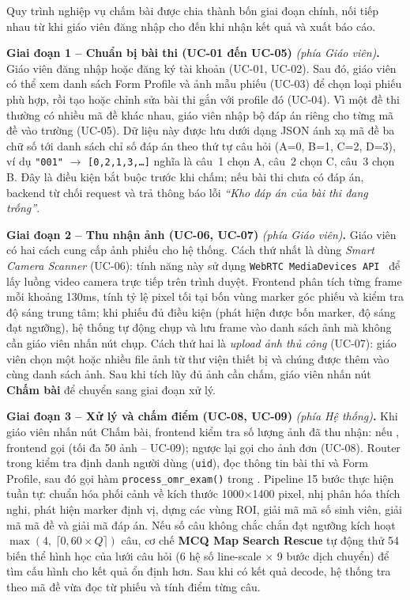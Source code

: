 Quy trình nghiệp vụ chấm bài được chia thành bốn giai đoạn chính, nối tiếp nhau từ khi giáo viên đăng nhập cho đến khi nhận kết quả và xuất báo cáo.

\textbf{Giai đoạn 1 -- Chuẩn bị bài thi (UC-01 đến UC-05)} \textit{(phía Giáo viên)}\textbf{.}
Giáo viên đăng nhập hoặc đăng ký tài khoản (UC-01, UC-02). Sau đó, giáo viên có thể xem danh sách Form Profile và ảnh mẫu phiếu (UC-03) để chọn loại phiếu phù hợp, rồi tạo hoặc chỉnh sửa bài thi gắn với profile đó (UC-04). Vì một đề thi thường có nhiều mã đề khác nhau, giáo viên nhập bộ đáp án riêng cho từng mã đề vào trường  (UC-05). Dữ liệu này được lưu dưới dạng JSON ánh xạ mã đề ba chữ số tới danh sách chỉ số đáp án theo thứ tự câu hỏi (A=0, B=1, C=2, D=3), ví dụ \texttt{"001"} $\to$ \texttt{[0,2,1,3,\ldots]} nghĩa là câu~1 chọn A, câu~2 chọn C, câu~3 chọn B. Đây là điều kiện bắt buộc trước khi chấm; nếu bài thi chưa có đáp án, backend từ chối request và trả thông báo lỗi \textit{``Kho đáp án của bài thi đang trống''}.

\textbf{Giai đoạn 2 -- Thu nhận ảnh (UC-06, UC-07)} \textit{(phía Giáo viên)}\textbf{.}
Giáo viên có hai cách cung cấp ảnh phiếu cho hệ thống. Cách thứ nhất là dùng \textit{Smart Camera Scanner} (UC-06): tính năng này sử dụng \texttt{WebRTC MediaDevices API}~\cite{webrtc} để lấy luồng video camera trực tiếp trên trình duyệt. Frontend phân tích từng frame mỗi khoảng 130ms, tính tỷ lệ pixel tối tại bốn vùng marker góc phiếu và kiểm tra độ sáng trung tâm; khi phiếu đủ điều kiện (phát hiện được bốn marker, độ sáng đạt ngưỡng), hệ thống tự động chụp và lưu frame vào danh sách ảnh mà không cần giáo viên nhấn nút chụp. Cách thứ hai là \textit{upload ảnh thủ công} (UC-07): giáo viên chọn một hoặc nhiều file ảnh từ thư viện thiết bị và chúng được thêm vào cùng danh sách ảnh. Sau khi tích lũy đủ ảnh cần chấm, giáo viên nhấn nút \textbf{Chấm bài} để chuyển sang giai đoạn xử lý.

\textbf{Giai đoạn 3 -- Xử lý và chấm điểm (UC-08, UC-09)} \textit{(phía Hệ thống)}\textbf{.}
Khi giáo viên nhấn nút Chấm bài, frontend kiểm tra số lượng ảnh đã thu nhận: nếu , frontend gọi  (tối đa 50 ảnh -- UC-09); ngược lại gọi  cho ảnh đơn (UC-08). Router trong  kiểm tra định danh người dùng (\texttt{uid}), đọc thông tin bài thi và Form Profile, sau đó gọi hàm \texttt{process\_omr\_exam()} trong . Pipeline 15 bước thực hiện tuần tự: chuẩn hóa phối cảnh về kích thước 1000$\times$1400 pixel, nhị phân hóa thích nghi, phát hiện marker định vị, dựng các vùng ROI, giải mã mã số sinh viên, giải mã mã đề và giải mã đáp án. Nếu số câu không chắc chắn đạt ngưỡng kích hoạt $\max(4,\ \lceil 0{,}60 \times Q \rceil)$ câu, cơ chế \textbf{MCQ Map Search Rescue} tự động thử 54 biến thể hình học của lưới câu hỏi (6 hệ số line-scale $\times$ 9 bước dịch chuyển) để tìm cấu hình cho kết quả ổn định hơn. Sau khi có kết quả decode, hệ thống tra  theo mã đề vừa đọc từ phiếu và tính điểm từng câu.

